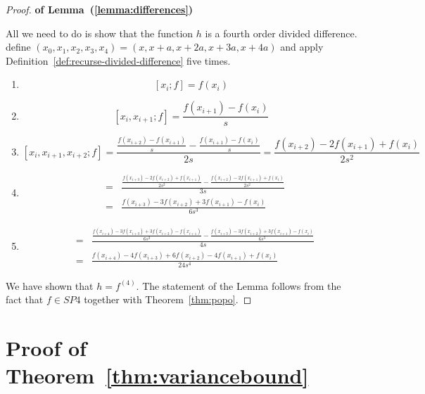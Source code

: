 \documentclass[anon,12pt]{colt2024} %
\begin{document}
\begin{proof} {\bf of Lemma~(\ref{lemma:differences})}

All we need to do is show that the function $h$ is a fourth order divided difference.
define $(x_0,x_1,x_2,x_3,x_4) = (x,x+a,x+2a,x+3a,x+4a)$ and apply Definition~\ref{def:recurse-divided-difference} five times.

\begin{enumerate}
\item
$$[x_i;f] = f(x_i)$$
\item
  $$[x_i,x_{i+1};f]=\frac{f(x_{i+1})-f(x_i)}{s}$$
\item
  $$[x_i,x_{i+1},x_{i+2};f] =
  \frac{\frac{f(x_{i+2})-f(x_{i+1})}{s}-\frac{f(x_{i+1})-f(x_i)}{s}}{2s}
  =\frac{f(x_{i+2})-2f(x_{i+1})+f(x_i)}{2 s^2}
  $$
\item
  \begin{eqnarray*}
    [x_i,x_{i+1},x_{i+2},x_{i+3};f]& = &
    \frac{\frac{f(x_{i+3})-2f(x_{i+2})+f(x_{i+1})}{2
    s^2}-\frac{f(x_{i+2})-2f(x_{i+1})+f(x_i)}{2
    s^2}}{3s}\\
    &=& \frac{f(x_{i+3}) -3f(x_{i+2})+3f(x_{i+1})-f(x_i)   }{6 s^3}
  \end{eqnarray*}
\item
  \begin{eqnarray*}
    [x_i,x_{i+1},x_{i+2},x_{i+3},x_{i+4};f]& = &
    \frac{\frac{f(x_{i+4}) -3f(x_{i+3})+3f(x_{i+2})-f(x_{i+1})   }{6 s^3}
    - \frac{f(x_{i+3}) -3f(x_{i+2})+3f(x_{i+1})-f(x_i)   }{6 s^3}}
    {4s}\\
    &=& \frac{f(x_{i+4})-4f(x_{i+3})+6f(x_{i+2})-4f(x_{i+1})+f(x_i)}{24s^4}
  \end{eqnarray*}
\end{enumerate}
We have shown that $h=f^{(4)}$. The statement of the Lemma follows from the fact that $f \in SP{4}$ together with Theorem~\ref{thm:popo}.
\end{proof}
  

\section{Proof of Theorem~\ref{thm:variancebound}}
\end{document}

